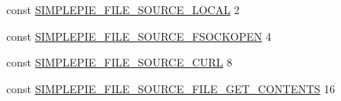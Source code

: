 \begin{DoxyCompactItemize}
\item 
const \hyperlink{simplepie_8inc_ab8d78f743db17e99b88c017376382827}{S\-I\-M\-P\-L\-E\-P\-I\-E\-\_\-\-F\-I\-L\-E\-\_\-\-S\-O\-U\-R\-C\-E\-\_\-\-L\-O\-C\-A\-L} 2
\item 
const \hyperlink{simplepie_8inc_a1df715e78dc11834c31efe0704522c3b}{S\-I\-M\-P\-L\-E\-P\-I\-E\-\_\-\-F\-I\-L\-E\-\_\-\-S\-O\-U\-R\-C\-E\-\_\-\-F\-S\-O\-C\-K\-O\-P\-E\-N} 4
\item 
const \hyperlink{simplepie_8inc_ab8cb0fd05c6e7a2ec591c6a2614c2477}{S\-I\-M\-P\-L\-E\-P\-I\-E\-\_\-\-F\-I\-L\-E\-\_\-\-S\-O\-U\-R\-C\-E\-\_\-\-C\-U\-R\-L} 8
\item 
const \hyperlink{simplepie_8inc_a436b6f23cde09bd0f1250bba3a364873}{S\-I\-M\-P\-L\-E\-P\-I\-E\-\_\-\-F\-I\-L\-E\-\_\-\-S\-O\-U\-R\-C\-E\-\_\-\-F\-I\-L\-E\-\_\-\-G\-E\-T\-\_\-\-C\-O\-N\-T\-E\-N\-T\-S} 16
\end{DoxyCompactItemize}


